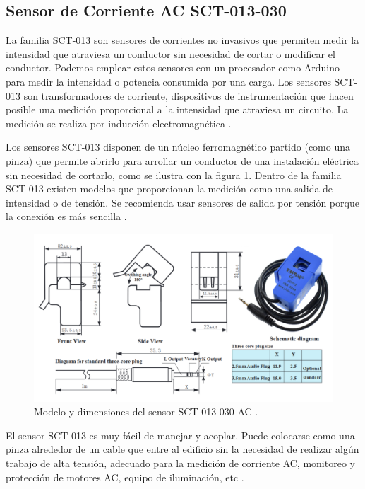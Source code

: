 \subsection{Sensor de Corriente AC SCT-013-030}

La familia SCT-013 son sensores de corrientes no invasivos que permiten medir la intensidad que atraviesa un conductor sin necesidad de cortar o modificar el conductor. Podemos emplear estos sensores con un procesador como Arduino para medir la intensidad o potencia consumida por una carga. Los sensores SCT-013 son transformadores de corriente, dispositivos de instrumentación que hacen posible una medición proporcional a la intensidad que atraviesa un circuito. La medición se realiza por inducción electromagnética \citep{WEBSITE:9}. 

Los sensores SCT-013 disponen de un núcleo ferromagnético partido (como una pinza) que permite abrirlo para arrollar un conductor de una instalación eléctrica sin necesidad de cortarlo, como se ilustra con la figura \ref{fig:sensorCorriente}. Dentro de la familia SCT-013 existen modelos que proporcionan la medición como una salida de intensidad o de tensión. Se recomienda usar sensores de salida por tensión porque la conexión es más sencilla \citep{WEBSITE:9}. 

\begin{figure}[htbp]
	\centering
	\includegraphics[width=1.0\textwidth]{./Figures/sensorCorriente2.png}
	\caption{Modelo y dimensiones del sensor SCT-013-030 AC \protect\footnotemark.}

	\label{fig:sensorCorriente}
\end{figure}


El sensor SCT-013 es muy fácil de manejar y acoplar. Puede colocarse como una pinza alrededor de un cable que entre al edificio sin la necesidad de realizar algún trabajo de alta tensión, adecuado para la medición de corriente AC, monitoreo y protección de motores AC, equipo de iluminación, etc \citep{WEBSITE:10}.

